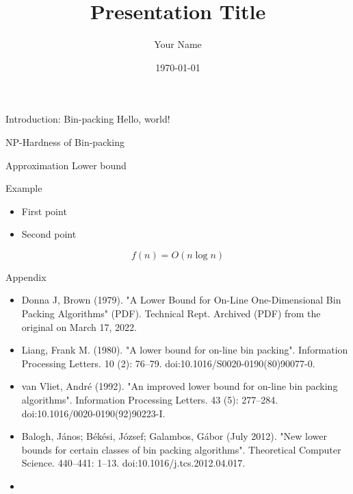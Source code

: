\documentclass{beamer}
\title{Presentation Title}
\author{Your Name}
\institute{NUS}
\date{\today}
\begin{document}
\begin{frame}
    \titlepage
\end{frame}

\begin{frame}{Introduction: Bin-packing}
    Hello, world!
\end{frame}

\begin{frame}{NP-Hardness of Bin-packing}


\end{frame}

\begin{frame}{Approximation Lower bound}
    


\end{frame}

\begin{frame}{Example}
    \begin{itemize}
        \item First point
        \item Second point
    \end{itemize}

    \[
        f(n) = O(n \log n)
    \]
\end{frame}


\begin{frame}{Appendix}
    \begin{itemize}
 \item Donna J, Brown (1979). "A Lower Bound for On-Line One-Dimensional Bin Packing Algorithms" (PDF). Technical Rept. Archived (PDF) from the original on March 17, 2022.
  \item Liang, Frank M. (1980). "A lower bound for on-line bin packing". Information Processing Letters. 10 (2): 76–79. doi:10.1016/S0020-0190(80)90077-0.
  \item van Vliet, André (1992). "An improved lower bound for on-line bin packing algorithms". Information Processing Letters. 43 (5): 277–284. doi:10.1016/0020-0190(92)90223-I.
  \item Balogh, János; Békési, József; Galambos, Gábor (July 2012). "New lower bounds for certain classes of bin packing algorithms". Theoretical Computer Science. 440–441: 1–13. doi:10.1016/j.tcs.2012.04.017.
        \item 
    \end{itemize}
\end{frame}
\end{document}
